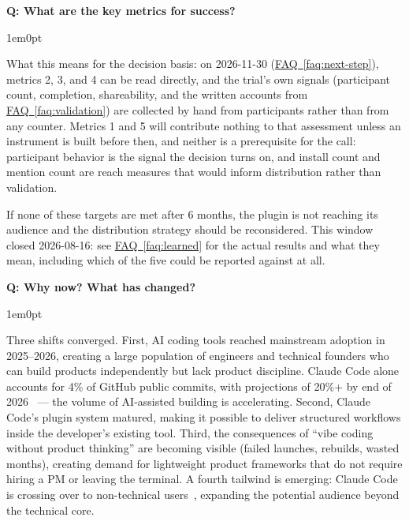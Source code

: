 \documentclass[11pt,letterpaper]{article}
\newcounter{faqnum}
\newenvironment{faqpair}[1]{%
  \needspace{4\baselineskip}%
  \vspace{0.5em}%
  \refstepcounter{faqnum}%
  \noindent\textbf{\color{SectionBlue}Q\thefaqnum: #1}\par\nopagebreak[4]%
  \vspace{0.2em}%
  \begin{adjustwidth}{1em}{0pt}%
  \setlength{\parindent}{0pt}%
}{%
  \end{adjustwidth}%
  \vspace{0.5em}%
}
\newcommand{\faqref}[1]{\hyperref[#1]{FAQ~\ref*{#1}}}
\begin{document}
\begin{faqpair}{What are the key metrics for success?}
  What this means for the decision basis: on 2026-11-30 (\faqref{faq:next-step}), metrics 2, 3, and 4 can be read directly, and the trial's own signals (participant count, completion, shareability, and the written accounts from \faqref{faq:validation}) are collected by hand from participants rather than from any counter. Metrics 1 and 5 will contribute nothing to that assessment unless an instrument is built before then, and neither is a prerequisite for the call: participant behavior is the signal the decision turns on, and install count and mention count are reach measures that would inform distribution rather than validation.

  If none of these targets are met after 6 months, the plugin is not reaching its audience and the distribution strategy should be reconsidered. This window closed 2026-08-16: see \faqref{faq:learned} for the actual results and what they mean, including which of the five could be reported against at all.
\end{faqpair}

\begin{faqpair}{Why now? What has changed?}
  Three shifts converged. First, AI coding tools reached mainstream adoption in 2025--2026, creating a large population of engineers and technical founders who can build products independently but lack product discipline. Claude Code alone accounts for 4\% of GitHub public commits, with projections of 20\%+ by end of 2026~\cite{semianalysis2026githubcommits} --- the volume of AI-assisted building is accelerating. Second, Claude Code's plugin system matured, making it possible to deliver structured workflows inside the developer's existing tool. Third, the consequences of ``vibe coding without product thinking'' are becoming visible (failed launches, rebuilds, wasted months), creating demand for lightweight product frameworks that do not require hiring a PM or leaving the terminal. A fourth tailwind is emerging: Claude Code is crossing over to non-technical users~\cite{nyt2026claudecode}, expanding the potential audience beyond the technical core.
\end{faqpair}
\end{document}
